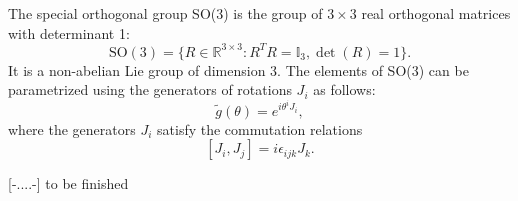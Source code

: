 \begin{example}
    The special orthogonal group SO(3) is the group of \(3 \times 3\) real orthogonal matrices with determinant 1:
    \[
        \mathrm{SO}(3) = \{ R \in \mathbb{R}^{3 \times 3} : R^T R = \mathbb{I}_3, \det(R) = 1 \}.
    \]
    It is a non-abelian Lie group of dimension 3. The elements of SO(3) can be parametrized using the generators of rotations \(J_i\) as follows:
    \[
        \tilde{g}(\theta) = e^{i \theta^i J_i},
    \]
    where the generators \(J_i\) satisfy the commutation relations
    \[
        [J_i, J_j] = i \epsilon_{ijk} J_k.
    \]

    [-....-] to be finished
\end{example}
